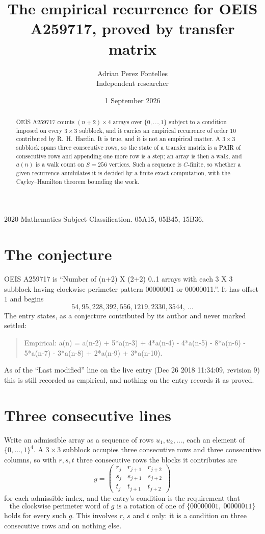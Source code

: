 \documentclass[11pt,a4paper]{article}
\title{The empirical recurrence for OEIS A259717, proved by transfer matrix}
\author{Adrian Perez Fontelles\\ \small Independent researcher}
\date{1 September 2026}
\theoremstyle{plain}
\theoremstyle{definition}
\begin{document}
\maketitle

\begin{abstract}
OEIS A259717 counts $(n+2)\times4$ arrays over $\{0,\dots,1\}$ subject to a condition imposed on
every $3\times3$ subblock, and it carries an empirical recurrence of order $10$
contributed by R.~H.~Hardin. It is true, and it is not an empirical matter. A $3\times3$
subblock spans three consecutive rows, so the state of a transfer matrix is a PAIR of
consecutive rows and appending one more row is a step; an array is then a walk, and
$a(n)$ is a walk count on $S=256$ vertices. Such a sequence is $C$-finite, so whether a given
recurrence annihilates it is decided by a finite exact computation, with the Cayley--Hamilton
theorem bounding the work.
\end{abstract}

\noindent\small 2020 Mathematics Subject Classification. 05A15, 05B45, 15B36.\normalsize

\section{The conjecture}

OEIS A259717 is ``Number of (n+2) X (2+2) 0..1 arrays with each 3 X 3 subblock having clockwise perimeter pattern 00000001 or 00000011.''. It has offset $1$ and begins
\[
54, 95, 228, 392, 556, 1219, 2330, 3544,\ \dots
\]
The entry states, as a conjecture contributed by its author and never marked settled:
\begin{quote}
Empirical: a(n) = a(n-2) + 5*a(n-3) + 4*a(n-4) - 4*a(n-5) - 8*a(n-6) - 5*a(n-7) - 3*a(n-8) + 2*a(n-9) + 3*a(n-10).
\end{quote}
As of the ``Last modified'' line on the live entry (Dec 26 2018 11:34:09, revision 9) this is still
recorded as empirical, and nothing on the entry records it as proved.

\section{Three consecutive lines}

Write an admissible array as a sequence of rows $u_1,u_2,\dots$, each an element of
$\{0,\dots,1\}^{4}$. A $3\times3$ subblock occupies three consecutive rows and
three consecutive columns, so with $r,s,t$ three consecutive rows the blocks it
contributes are
\[
g=\begin{pmatrix}r_j&r_{j+1}&r_{j+2}\\ s_j&s_{j+1}&s_{j+2}\\ t_j&t_{j+1}&t_{j+2}\end{pmatrix}
\]
for each admissible index, and the entry's condition is the requirement that
\[
\text{the clockwise perimeter word of }g\text{ is a rotation of one of }\{00000001,\ 00000011\}
\]
holds for every such $g$. This involves $r$, $s$ and $t$ only: it is a condition on
three consecutive rows and on nothing else.
\end{document}
